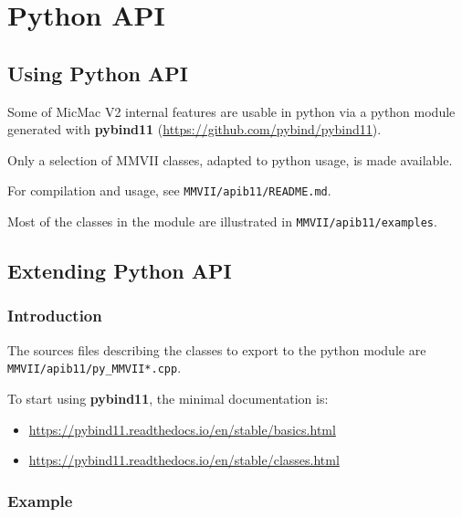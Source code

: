 

\chapter{Python API}


\section{Using Python API}

Some of MicMac V2 internal features are usable in python via a python module generated
with \textbf{pybind11} (\url{https://github.com/pybind/pybind11}).

Only a selection of MMVII classes, adapted to python usage, is made available.

For compilation and usage, see \texttt{MMVII/apib11/README.md}.

Most of the classes in the module are illustrated in \texttt{MMVII/apib11/examples}. 

\section{Extending Python API}
\label{Prog:Py:Extending}
\subsection{Introduction}

The sources files describing the classes to export to the python module are \texttt{MMVII/apib11/py\_MMVII*.cpp}.

To start using \textbf{pybind11}, the minimal documentation is:
\begin{itemize}
  \item \url{https://pybind11.readthedocs.io/en/stable/basics.html}
  \item \url{https://pybind11.readthedocs.io/en/stable/classes.html}
\end{itemize}

\subsection{Example}


